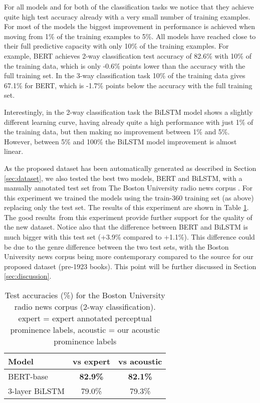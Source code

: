 \documentclass[11pt]{article}
\begin{document}
For all models and for both of the classification tasks we notice that they achieve quite high test accuracy already with a very small number of training examples. For most of the models the biggest improvement in performance is achieved when moving from 1\% of the training examples to 5\%. All models have reached close to their full predictive capacity with only 10\% of the training examples. For example, BERT achieves 2-way classification test accuracy of 82.6\% with 10\% of the training data, which is only -0.6\% points lower than the accuracy with the full training set. In the 3-way classification task 10\% of the training data gives 67.1\% for BERT, which is -1.7\% points below the accuracy with the full training set.

Interestingly, in the 2-way classification task the BiLSTM model shows a slightly different learning curve, having already quite a high performance with just 1\% of the training data, but then making no improvement between 1\% and 5\%. However, between 5\% and 100\% the BiLSTM model improvement is almost linear. 

As the proposed dataset has been automatically generated as described in Section \ref{sec:dataset}, we also tested the best two models, BERT and BiLSTM, with a manually annotated test set from The Boston University radio news corpus \cite{ostendorf1995boston}. For this experiment we trained the models using the train-360 training set (as above) replacing only the test set. The results of this experiment are shown in Table \ref{tab:results_boston}. The good results\footnotemark ~from this experiment provide further support for the quality of the new dataset. Notice also that the difference between BERT and BiLSTM is much bigger with this test set (+3.9\% compared to +1.1\%). This difference could be due to the genre difference between the two test sets, with the Boston University news corpus being more contemporary compared to the source for our proposed dataset (pre-1923 books). This point will be further discussed in Section \ref{sec:discussion}.

\begin{table}[h!]
    \centering
    \begin{tabular}{lcc}
    \hline
    \bf Model & \bf vs expert & \bf vs acoustic\\
    \hline
        BERT-base & \bf 82.9\% & \bf 82.1\% \\
        3-layer BiLSTM & 79.0\% & 79.3\% \\
    \hline
    \end{tabular}
    \caption{Test accuracies (\%) for the Boston University radio news corpus (2-way classification). expert = expert annotated perceptual prominence labels, acoustic = our acoustic prominence labels }
    \label{tab:results_boston}
\end{table}
\end{document}
